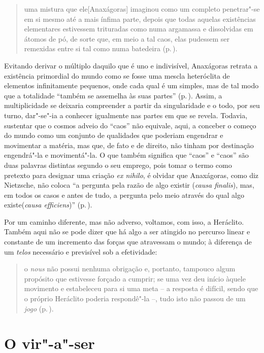 \begin{quote} uma mistura que ele[Anaxágoras] imaginou como um completo
 penetrar"-se em si mesmo até a mais ínfima parte, depois que todas aquelas
 existências elementares estivessem trituradas como numa argamassa e
 dissolvidas em átomos de pó, de sorte que, em meio a tal caos, elas pudessem
 ser remexidas entre si tal como numa batedeira (p.\,\pageref{mistura}).
\end{quote} 

Evitando derivar o múltiplo daquilo que é uno e indivisível, Anaxágoras
retrata a existência primordial do mundo como se fosse uma mescla heteróclita
de elementos infinitamente pequenos, onde cada qual é um simples, mas de tal
modo que a totalidade ``também se assemelha às suas partes'' (p.\,\pageref{suaspartes}). 
Assim, a multiplicidade se deixaria compreender a partir da
singularidade e o todo, por seu turno, dar"-se"-ia a conhecer igualmente nas
partes em que se revela. Todavia, sustentar que o cosmos adveio do ``caos''
não equivale, aqui, a conceber o começo do mundo como um conjunto de
qualidades que poderiam engendrar e movimentar a matéria, mas que, de fato e
de direito, não tinham por destinação engendrá"-la e movimentá"-la. O que
também significa que ``caos'' e ``caos'' são duas palavras distintas segundo
o seu emprego, pois tomar o termo como pretexto para designar uma
criação \textit{ex nihilo}, é olvidar que Anaxágoras, como diz Nietzsche, não
coloca ``a pergunta pela razão de algo existir (\textit{causa finalis}), mas,
em todos os casos e antes de tudo, a pergunta pelo meio através do qual algo
existe(\textit{causa efficiens})'' (p.\,\pageref{causafinalis}).

Por um caminho diferente, mas não adverso, voltamos, com isso, a Heráclito.
Também aqui não se pode dizer que há algo a ser atingido no percurso linear e
constante de um incremento das forças que atravessam o mundo; à diferença de
um \textit{telos} necessário e previsível sob a efetividade: 

\begin{quote} o \textit{nous} não possui nenhuma obrigação e, portanto,
 tampouco algum propósito que estivesse forçado a cumprir; se uma vez deu
 início àquele movimento e estabeleceu para si uma meta -- a resposta é
 difícil, sendo que o próprio Heráclito poderia respondê"-la --, tudo isto
 não passou de um
\textit{jogo} (p.\,\pageref{naopossuinenhuma}).
\end{quote} 

\section{O vir"-a"-ser}

